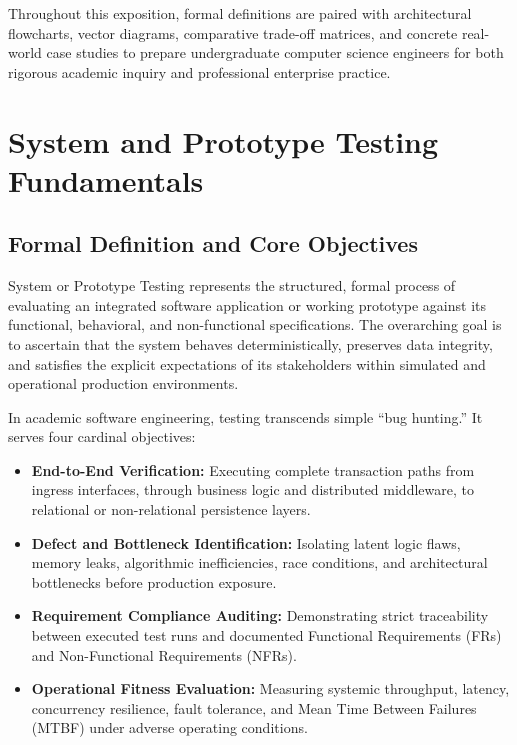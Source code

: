 \documentclass[11pt,a4paper]{article}
\begin{document}
Throughout this exposition, formal definitions are paired with architectural flowcharts, vector diagrams, comparative trade-off matrices, and concrete real-world case studies to prepare undergraduate computer science engineers for both rigorous academic inquiry and professional enterprise practice.

\section[System Testing Fundamentals]{System and Prototype Testing Fundamentals}
\label{sec:testing_fundamentals}

\subsection{Formal Definition and Core Objectives}
System or Prototype Testing represents the structured, formal process of evaluating an integrated software application or working prototype against its functional, behavioral, and non-functional specifications. The overarching goal is to ascertain that the system behaves deterministically, preserves data integrity, and satisfies the explicit expectations of its stakeholders within simulated and operational production environments.

In academic software engineering, testing transcends simple ``bug hunting.'' It serves four cardinal objectives:
\begin{itemize}
    \item \textbf{End-to-End Verification:} Executing complete transaction paths from ingress interfaces, through business logic and distributed middleware, to relational or non-relational persistence layers.
    \item \textbf{Defect and Bottleneck Identification:} Isolating latent logic flaws, memory leaks, algorithmic inefficiencies, race conditions, and architectural bottlenecks before production exposure.
    \item \textbf{Requirement Compliance Auditing:} Demonstrating strict traceability between executed test runs and documented Functional Requirements (FRs) and Non-Functional Requirements (NFRs).
    \item \textbf{Operational Fitness Evaluation:} Measuring systemic throughput, latency, concurrency resilience, fault tolerance, and Mean Time Between Failures (MTBF) under adverse operating conditions.
\end{itemize}
\end{document}
